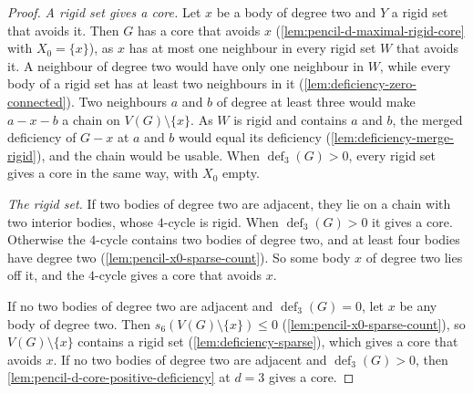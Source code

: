 \begin{proof}
  \emph{A rigid set gives a core.} Let $x$ be a body of degree two and
  $Y$ a rigid set that avoids it. Then $G$ has a core that avoids $x$
  (\cref{lem:pencil-d-maximal-rigid-core} with $X_0 = \{x\}$), as $x$
  has at most one neighbour in every rigid set $W$ that avoids it. A
  neighbour of degree two would have only one neighbour in $W$, while
  every body of a rigid set has at least two neighbours in it
  (\cref{lem:deficiency-zero-connected}). Two neighbours $a$ and $b$ of
  degree at least three would make $a - x - b$ a chain on
  $V(G) \setminus \{x\}$. As $W$ is rigid and contains $a$ and $b$, the
  merged deficiency of $G - x$ at $a$ and $b$ would equal its deficiency
  (\cref{lem:deficiency-merge-rigid}), and the chain would be usable.
  When $\operatorname{def}_3(G) > 0$, every rigid set gives a core in
  the same way, with $X_0$ empty.

  \emph{The rigid set.} If two bodies of degree two are adjacent, they
  lie on a chain with two interior bodies, whose $4$-cycle is rigid. When
  $\operatorname{def}_3(G) > 0$ it gives a core. Otherwise the
  $4$-cycle contains two bodies of degree two, and at least four bodies
  have degree two (\cref{lem:pencil-x0-sparse-count}). So some body $x$
  of degree two lies off it, and the $4$-cycle gives a core that avoids
  $x$.

  If no two bodies of degree two are adjacent and
  $\operatorname{def}_3(G) = 0$, let $x$ be any body of degree two. Then
  $s_6(V(G) \setminus \{x\}) \le 0$ (\cref{lem:pencil-x0-sparse-count}),
  so $V(G) \setminus \{x\}$ contains a rigid set
  (\cref{lem:deficiency-sparse}), which gives a core that avoids $x$.
  If no two bodies of degree two are adjacent and
  $\operatorname{def}_3(G) > 0$, then
  \cref{lem:pencil-d-core-positive-deficiency} at $d = 3$ gives a core.
\end{proof}

